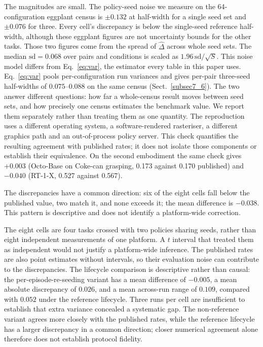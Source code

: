 \documentclass[pdflatex,iicol,sn-apa]{sn-jnl}
\theoremstyle{remark}
\begin{document}
The magnitudes are small. The policy-seed noise we measure on the 64-configuration eggplant census is
$\pm 0.132$ at half-width for a single seed set and $\pm 0.076$ for three.
Every cell's discrepancy is below the single-seed reference
half-width, although these eggplant figures are not uncertainty bounds for the other tasks. Those two
figures come from the spread of $\hat\Delta$ across whole seed sets. The median
$\mathrm{sd} = 0.068$ over pairs and conditions is scaled as $1.96\,\mathrm{sd}/\sqrt{S}$.
This noise model differs from Eq.~\eqref{eq:var}, the estimator every table in this paper uses. Eq.~\eqref{eq:var}
pools per-configuration run variances and gives per-pair three-seed half-widths of $0.075$--$0.088$
on the same census (Sect.~\ref{subsec7_6}). The two answer different questions: how far a
whole-census result moves between seed sets, and how precisely one census estimates the benchmark
value. We report them separately rather than treating them as one quantity. The reproduction
uses a different operating system, a software-rendered rasteriser, a different graphics path and an
out-of-process policy server. This check quantifies the resulting agreement with published rates;
it does not isolate those components or establish their equivalence. On the second embodiment the same check gives $+0.003$
(Octo-Base on Coke-can grasping, 0.173 against 0.170 published) and $-0.040$ (RT-1-X, 0.527 against
0.567).

The discrepancies have a common direction: six of the eight cells fall below the published
value, two match it, and none exceeds it; the mean difference is $-0.038$.
This pattern is descriptive and does not identify a platform-wide correction.

The eight cells are four tasks crossed with two policies sharing seeds, rather than eight
independent measurements of one platform. A $t$ interval that treated them as independent would
not justify a platform-wide inference. The published rates are also point estimates without
intervals, so their evaluation noise can contribute to the discrepancies. The lifecycle comparison
is descriptive rather than causal: the per-episode-re-seeding variant has a mean difference of
$-0.005$, a mean absolute discrepancy of $0.026$, and a mean across-run range of $0.109$, compared with $0.052$ under the reference
lifecycle. Three runs per cell are insufficient to establish that extra variance concealed a
systematic gap. The non-reference variant agrees more closely with the published rates, while the
reference lifecycle has a larger discrepancy in a common direction; closer numerical agreement
alone therefore does not establish protocol fidelity.
\end{document}
